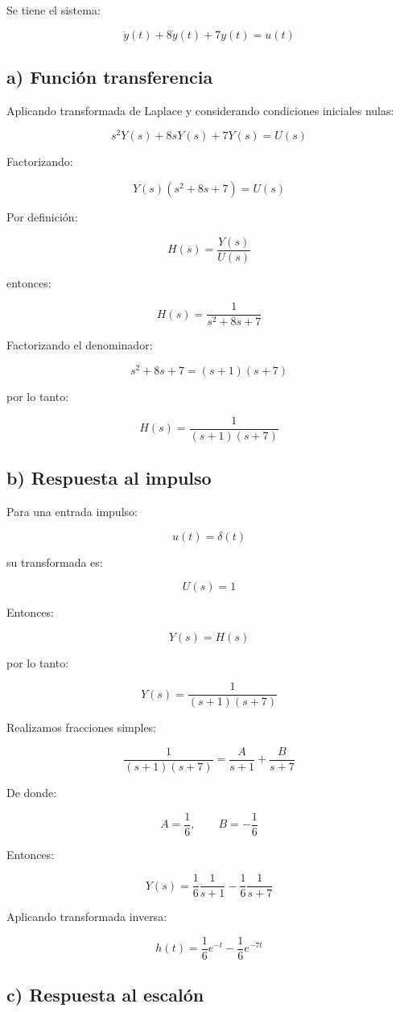 \documentclass[12pt,a4paper]{article}
\begin{document}
Se tiene el sistema:

\[
\ddot{y}(t)+8\dot{y}(t)+7y(t)=u(t)
\]

\subsection*{a) Función transferencia}

Aplicando transformada de Laplace y considerando condiciones iniciales nulas:

\[
s^2Y(s)+8sY(s)+7Y(s)=U(s)
\]

Factorizando:

\[
Y(s)(s^2+8s+7)=U(s)
\]

Por definición:

\[
H(s)=\frac{Y(s)}{U(s)}
\]

entonces:

\[
\boxed{
H(s)=\frac{1}{s^2+8s+7}
}
\]

Factorizando el denominador:

\[
s^2+8s+7=(s+1)(s+7)
\]

por lo tanto:

\[
\boxed{
H(s)=\frac{1}{(s+1)(s+7)}
}
\]

\subsection*{b) Respuesta al impulso}

Para una entrada impulso:

\[
u(t)=\delta(t)
\]

su transformada es:

\[
U(s)=1
\]

Entonces:

\[
Y(s)=H(s)
\]

por lo tanto:

\[
Y(s)=\frac{1}{(s+1)(s+7)}
\]

Realizamos fracciones simples:

\[
\frac{1}{(s+1)(s+7)}
=
\frac{A}{s+1}+\frac{B}{s+7}
\]

De donde:

\[
A=\frac{1}{6},
\qquad
B=-\frac{1}{6}
\]

Entonces:

\[
Y(s)
=
\frac{1}{6}\frac{1}{s+1}
-
\frac{1}{6}\frac{1}{s+7}
\]

Aplicando transformada inversa:

\[
\boxed{
h(t)=
\frac{1}{6}e^{-t}
-
\frac{1}{6}e^{-7t}
}
\]

\subsection*{c) Respuesta al escalón}
\end{document}
